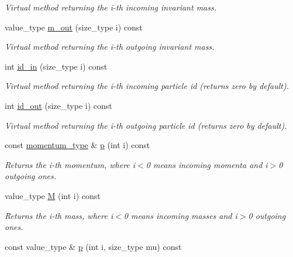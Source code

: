 \begin{DoxyCompactItemize}
\begin{DoxyCompactList}\small\item\em Virtual method returning the i-\/th incoming invariant mass. \end{DoxyCompactList}\item 
\hypertarget{a00529_a4d195f3f1c1f7ca1558167ccc0270f10}{value\-\_\-type \hyperlink{a00529_a4d195f3f1c1f7ca1558167ccc0270f10}{m\-\_\-out} (size\-\_\-type i) const }\label{a00529_a4d195f3f1c1f7ca1558167ccc0270f10}

\begin{DoxyCompactList}\small\item\em Virtual method returning the i-\/th outgoing invariant mass. \end{DoxyCompactList}\item 
int \hyperlink{a00529_a07fed7558892782e27d85ee4fe009c83}{id\-\_\-in} (size\-\_\-type i) const 
\begin{DoxyCompactList}\small\item\em Virtual method returning the i-\/th incoming particle id (returns zero by default). \end{DoxyCompactList}\item 
int \hyperlink{a00529_a9670babe6e6eb25f8d13102043e7da2f}{id\-\_\-out} (size\-\_\-type i) const 
\begin{DoxyCompactList}\small\item\em Virtual method returning the i-\/th outgoing particle id (returns zero by default). \end{DoxyCompactList}\item 
const \hyperlink{a00559}{momentum\-\_\-type} \& \hyperlink{a00529_a1448d1b1703d189b695bc5a574f3ffd0}{p} (int i) const 
\begin{DoxyCompactList}\small\item\em Returns the i-\/th momentum, where i$<$0 means incoming momenta and i$>$0 outgoing ones. \end{DoxyCompactList}\item 
value\-\_\-type \hyperlink{a00529_a758913b3b8feb0f048f815e468c2f2b8}{M} (int i) const 
\begin{DoxyCompactList}\small\item\em Returns the i-\/th mass, where i$<$0 means incoming masses and i$>$0 outgoing ones. \end{DoxyCompactList}\item 
\hypertarget{a00529_a13b9a1c17155b45fd90e69ef4e087ce1}{const value\-\_\-type \& \hyperlink{a00529_a13b9a1c17155b45fd90e69ef4e087ce1}{p} (int i, size\-\_\-type mu) const }\label{a00529_a13b9a1c17155b45fd90e69ef4e087ce1}


\end{DoxyCompactItemize}
